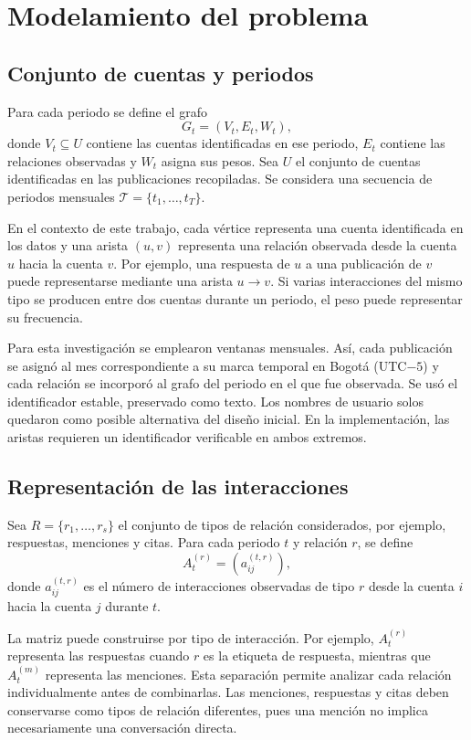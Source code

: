 \documentclass[journal]{IEEEtran}
\begin{document}
\section{Modelamiento del problema}
\subsection{Conjunto de cuentas y periodos}
Para cada periodo se define el grafo
\[
G_t=(V_t,E_t,W_t),
\]
donde $V_t\subseteq U$ contiene las cuentas identificadas en ese periodo, $E_t$ contiene las relaciones observadas y $W_t$ asigna sus pesos. Sea $U$ el conjunto de cuentas identificadas en las publicaciones recopiladas. Se considera una secuencia de periodos mensuales $\mathcal T=\{t_1,\ldots,t_T\}$.

En el contexto de este trabajo, cada vértice representa una cuenta identificada en los datos y una arista $(u,v)$ representa una relación observada desde la cuenta $u$ hacia la cuenta $v$. Por ejemplo, una respuesta de $u$ a una publicación de $v$ puede representarse mediante una arista $u\to v$. Si varias interacciones del mismo tipo se producen entre dos cuentas durante un periodo, el peso puede representar su frecuencia.

Para esta investigación se emplearon ventanas mensuales. Así, cada publicación se asignó al mes correspondiente a su marca temporal en Bogotá (UTC$-5$) y cada relación se incorporó al grafo del periodo en el que fue observada. Se usó el identificador estable, preservado como texto. Los nombres de usuario solos quedaron como posible alternativa del diseño inicial. En la implementación, las aristas requieren un identificador verificable en ambos extremos.

\subsection{Representación de las interacciones}
Sea $R=\{r_1,\ldots,r_s\}$ el conjunto de tipos de relación considerados, por ejemplo, respuestas, menciones y citas. Para cada periodo $t$ y relación $r$, se define
\[
A^{(r)}_t=(a^{(t,r)}_{ij}),
\]
donde $a^{(t,r)}_{ij}$ es el número de interacciones observadas de tipo $r$ desde la cuenta $i$ hacia la cuenta $j$ durante $t$.

La matriz puede construirse por tipo de interacción. Por ejemplo, $A^{(r)}_t$ representa las respuestas cuando $r$ es la etiqueta de respuesta, mientras que $A^{(m)}_t$ representa las menciones. Esta separación permite analizar cada relación individualmente antes de combinarlas. Las menciones, respuestas y citas deben conservarse como tipos de relación diferentes, pues una mención no implica necesariamente una conversación directa.
\end{document}
